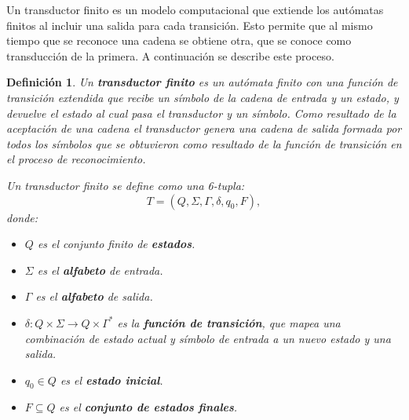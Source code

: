 \documentclass[12pt]{article}
\newtheorem{definition}{Definición}
\begin{document}
Un transductor finito \cite{finite_transducer} es un modelo computacional que extiende los autómatas finitos al 
incluir una salida para cada transición. Esto permite que al mismo tiempo que se reconoce una cadena se obtiene otra, 
que se conoce como transducción de la primera. A continuación se describe este proceso.

\begin{definition}
  Un \textbf{transductor finito} es un autómata finito con una función de transición extendida que recibe un símbolo de la cadena de entrada y un estado, y devuelve el estado al cual pasa el transductor y un símbolo.  Como resultado de la aceptación de una cadena el transductor genera una cadena de salida formada por todos los símbolos que se obtuvieron como resultado de la función de transición en el proceso de reconocimiento.
  
  Un transductor finito se define como una 6-tupla:
  \[
    T = (Q, \Sigma, \Gamma, \delta, q_0, F),
  \]
  donde:
  \begin{itemize}
    \item \(Q\) es el conjunto finito de \textbf{estados}.
    \item \(\Sigma\) es el \textbf{alfabeto} de entrada.
    \item \(\Gamma\) es el \textbf{alfabeto} de salida.
    \item \(\delta: Q \times \Sigma \to Q \times \Gamma^*\) es la \textbf{función de transición}, que mapea una combinación de estado actual y símbolo de entrada a un nuevo estado y una salida.
    \item \(q_0 \in Q\) es el \textbf{estado inicial}.
    \item \(F \subseteq Q\) es el \textbf{conjunto de estados finales}.
  \end{itemize}
\end{definition}
\end{document}
